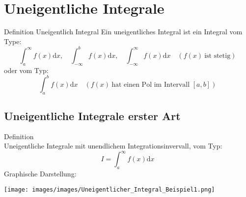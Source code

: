 \section{Uneigentliche Integrale}
\begin{definition}{Definition Uneigentlich Integral}
	Ein uneigentliches Integral ist ein Integral vom Type:
	\[\int_a^\infty{f(x)\mathrm{d}x}, \quad \int_{-\infty}^b{f(x)\mathrm{d}x}, \quad
	\int_{-\infty}^{\infty}{f(x)\mathrm{d}x} \quad (f(x) \: \text{ist stetig}) \]
	oder vom Typ:
	\[\int_a^b{f(x)\mathrm{d}x} \quad (f(x)\:\text{hat einen Pol im Intervall }[a,b]) \]
\end{definition}
\subsection{Uneigentliche Integrale erster Art}
\begin{definition}{Definition}\\
	Uneigentliche Integrale mit unendlichem Integrationsinvervall, vom Typ:
	\[I=\int_a^{\infty}{f(x)\mathrm{d}x} \]
Graphische Darstellung:
  \begin{center}
	  \texttt{[image: images/images/Uneigentlicher\_Integral\_Beispiel1.png]}
  \end{center}
\end{definition}
